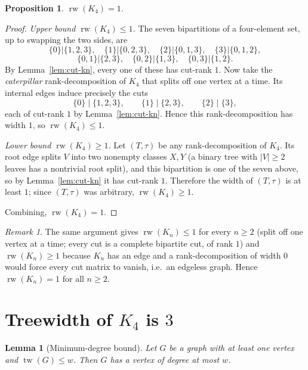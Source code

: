 \documentclass[11pt]{article}
\newtheorem{lemma}[theorem]{Lemma}
\newtheorem{proposition}[theorem]{Proposition}
\theoremstyle{definition}
\theoremstyle{remark}
\newtheorem{remark}[theorem]{Remark}
\newcommand{\rw}{\operatorname{rw}}
\newcommand{\tw}{\operatorname{tw}}
\begin{document}
\begin{proposition}\label{prop:rw-k4}
$\rw(K_4) = 1$.
\end{proposition}

\begin{proof}
\emph{Upper bound $\rw(K_4) \le 1$.} The seven bipartitions of a four-element
set, up to swapping the two sides, are
\[
\{0\}|\{1,2,3\},\quad \{1\}|\{0,2,3\},\quad \{2\}|\{0,1,3\},\quad
\{3\}|\{0,1,2\},
\]
\[
\{0,1\}|\{2,3\},\quad \{0,2\}|\{1,3\},\quad \{0,3\}|\{1,2\}.
\]
By Lemma~\ref{lem:cut-kn}, every one of these has cut-rank $1$. Now take the
\emph{caterpillar} rank-decomposition of $K_4$ that splits off one vertex at a
time. Its internal edges induce precisely the cuts
\[
\{0\} \mid \{1,2,3\}, \qquad \{1\} \mid \{2,3\}, \qquad \{2\} \mid \{3\},
\]
each of cut-rank $1$ by Lemma~\ref{lem:cut-kn}. Hence this
rank-decomposition has width $1$, so $\rw(K_4) \le 1$.

\emph{Lower bound $\rw(K_4) \ge 1$.} Let $(T,\tau)$ be any rank-decomposition
of $K_4$. Its root edge splits $V$ into two nonempty classes $X, Y$ (a binary
tree with $|V| \ge 2$ leaves has a nontrivial root split), and this
bipartition is one of the seven above, so by Lemma~\ref{lem:cut-kn} it has
cut-rank $1$. Therefore the width of $(T,\tau)$ is at least $1$; since
$(T,\tau)$ was arbitrary, $\rw(K_4) \ge 1$.

Combining, $\rw(K_4) = 1$.
\end{proof}

\begin{remark}
The same argument gives $\rw(K_n) \le 1$ for every $n \ge 2$ (split off one
vertex at a time; every cut is a complete bipartite cut, of rank $1$) and
$\rw(K_n) \ge 1$ because $K_n$ has an edge and a rank-decomposition of width
$0$ would force every cut matrix to vanish, i.e.\ an edgeless graph. Hence
$\rw(K_n) = 1$ for all $n \ge 2$.
\end{remark}

\section{Treewidth of $K_4$ is $3$}

\begin{lemma}[Minimum-degree bound]\label{lem:min-degree}
Let $G$ be a graph with at least one vertex and $\tw(G) \le w$. Then $G$ has a
vertex of degree at most $w$.
\end{lemma}
\end{document}
